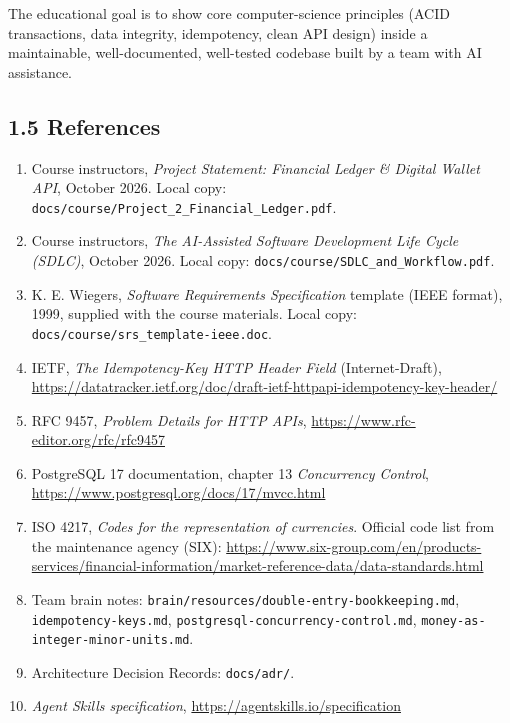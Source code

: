 \documentclass[11pt,a4paper]{article}
\providecommand{\tightlist}{\setlength{\itemsep}{2pt}\setlength{\parskip}{0pt}}
\begin{document}
The educational goal is to show core computer-science principles (ACID transactions, data
integrity, idempotency, clean API design) inside a maintainable, well-documented, well-tested
codebase built by a team with AI assistance.

\subsection{1.5 References}\label{references}

\begin{enumerate}
\def\labelenumi{\arabic{enumi}.}
\tightlist
\item
  Course instructors, \emph{Project Statement: Financial Ledger \& Digital Wallet API}, October 2026.
  Local copy: \texttt{docs/\allowbreak{}course/\allowbreak{}Project\_\allowbreak{}2\_\allowbreak{}Financial\_\allowbreak{}Ledger.pdf}.
\item
  Course instructors, \emph{The AI-Assisted Software Development Life Cycle (SDLC)}, October 2026.
  Local copy: \texttt{docs/\allowbreak{}course/\allowbreak{}SDLC\_\allowbreak{}and\_\allowbreak{}Workflow.pdf}.
\item
  K. E. Wiegers, \emph{Software Requirements Specification} template (IEEE format), 1999, supplied with
  the course materials. Local copy: \texttt{docs/\allowbreak{}course/\allowbreak{}srs\_\allowbreak{}template-ieee.doc}.
\item
  IETF, \emph{The Idempotency-Key HTTP Header Field} (Internet-Draft),
  \url{https://datatracker.ietf.org/doc/draft-ietf-httpapi-idempotency-key-header/}
\item
  RFC 9457, \emph{Problem Details for HTTP APIs}, \url{https://www.rfc-editor.org/rfc/rfc9457}
\item
  PostgreSQL 17 documentation, chapter 13 \emph{Concurrency Control},
  \url{https://www.postgresql.org/docs/17/mvcc.html}
\item
  ISO 4217, \emph{Codes for the representation of currencies}. Official code list from the
  maintenance agency (SIX): \url{https://www.six-group.com/en/products-services/financial-information/market-reference-data/data-standards.html}
\item
  Team brain notes: \texttt{brain/\allowbreak{}resources/\allowbreak{}double-entry-bookkeeping.md}, \texttt{idempotency-keys.md},
  \texttt{postgresql-concurrency-control.md}, \texttt{money-as-integer-minor-units.md}.
\item
  Architecture Decision Records: \texttt{docs/\allowbreak{}adr/\allowbreak{}}.
\item
  \emph{Agent Skills specification}, \url{https://agentskills.io/specification}
\end{enumerate}
\end{document}
